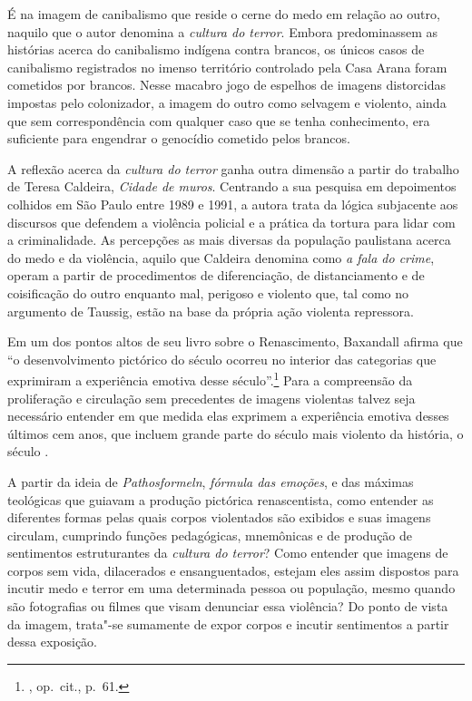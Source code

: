 É na imagem de canibalismo que reside o cerne do medo em relação ao
outro, naquilo que o autor denomina a \emph{cultura do terror}. Embora
predominassem as histórias acerca do canibalismo indígena contra
brancos, os únicos casos de canibalismo registrados no imenso território
controlado pela Casa Arana foram cometidos por brancos. Nesse macabro
jogo de espelhos de imagens distorcidas impostas pelo colonizador, a
imagem do outro como selvagem e violento, ainda que sem correspondência
com qualquer caso que se tenha conhecimento, era suficiente para
engendrar o genocídio cometido pelos brancos.

A reflexão acerca da \emph{cultura do terror} ganha outra dimensão a
partir do trabalho de Teresa Caldeira, \emph{Cidade de muros}. Centrando
a sua pesquisa em depoimentos colhidos em São Paulo entre 1989 e 1991, a
autora trata da lógica subjacente aos discursos que defendem a
violência policial e a prática da tortura para lidar com a
criminalidade. As percepções as mais diversas da população paulistana
acerca do medo e da violência, aquilo que Caldeira denomina como \emph{a
fala do crime}, operam a partir de procedimentos de diferenciação, de
distanciamento e de coisificação do outro enquanto mal, perigoso e
violento que, tal como no argumento de Taussig, estão na base da própria
ação violenta repressora.

\asterisc

Em um dos pontos altos de seu livro sobre o Renascimento, Baxandall
afirma que ``o desenvolvimento pictórico do século  ocorreu no
interior das categorias que exprimiram a experiência emotiva desse
século''.\footnote{, op.~cit., p.~61.} Para a compreensão da
proliferação e circulação sem precedentes de imagens violentas talvez
seja necessário entender em que medida elas exprimem a experiência
emotiva desses últimos cem anos, que incluem grande parte do século
mais violento da história, o século .

A partir da ideia de \emph{Pathosformeln}, \emph{fórmula das emoções},
e das máximas teológicas que guiavam a produção pictórica renascentista,
como entender as diferentes formas pelas quais corpos violentados são
exibidos e suas imagens circulam, cumprindo funções pedagógicas,
mnemônicas e de produção de sentimentos estruturantes da \emph{cultura
do terror}? Como entender que imagens de corpos sem vida, dilacerados e ensanguentados,
estejam eles assim dispostos para incutir medo e terror em uma
determinada pessoa ou população, mesmo quando são fotografias ou
filmes que visam denunciar essa violência? Do ponto de vista da imagem,
trata"-se sumamente de expor corpos e incutir sentimentos a partir dessa
exposição.

